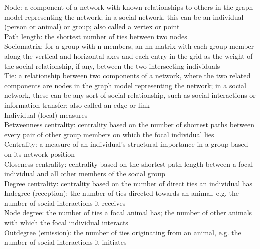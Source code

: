 Node: a component of a network with known relationships
to others in the graph model representing the network; in
a social network, this can be an individual (person or animal)
or group; also called a vertex or point\\

Path length: the shortest number of ties between two nodes\\

Sociomatrix: for a group with n members, an nn matrix
with each group member along the vertical and horizontal
axes and each entry in the grid as the weight of the social relationship,
if any, between the two intersecting individuals\\

Tie: a relationship between two components of a network,
where the two related components are nodes in the graph
model representing the network; in a social network, these
can be any sort of social relationship, such as social interactions
or information transfer; also called an edge or link\\

Individual (local) measures\\

Betweenness centrality: centrality based on the number of
shortest paths between every pair of other group members
on which the focal individual lies\\

Centrality: a measure of an individual’s structural importance
in a group based on its network position\\

Closeness centrality: centrality based on the shortest path
length between a focal individual and all other members of
the social group\\

Degree centrality: centrality based on the number of direct
ties an individual has\\

Indegree (reception): the number of ties directed towards
an animal, e.g. the number of social interactions it receives\\

Node degree: the number of ties a focal animal has; the
number of other animals with which the focal individual
interacts\\

Outdegree (emission): the number of ties originating from
an animal, e.g. the number of social interactions it initiates\\

